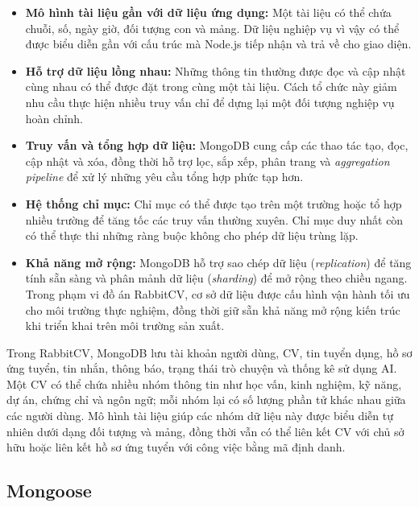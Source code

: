 \begin{itemize}
    \item \textbf{Mô hình tài liệu gần với dữ liệu ứng dụng:} Một tài liệu có thể chứa chuỗi, số, ngày giờ, đối tượng con và mảng. Dữ liệu nghiệp vụ vì vậy có thể được biểu diễn gần với cấu trúc mà Node.js tiếp nhận và trả về cho giao diện.

    \item \textbf{Hỗ trợ dữ liệu lồng nhau:} Những thông tin thường được đọc và cập nhật cùng nhau có thể được đặt trong cùng một tài liệu. Cách tổ chức này giảm nhu cầu thực hiện nhiều truy vấn chỉ để dựng lại một đối tượng nghiệp vụ hoàn chỉnh.

    \item \textbf{Truy vấn và tổng hợp dữ liệu:} MongoDB cung cấp các thao tác tạo, đọc, cập nhật và xóa, đồng thời hỗ trợ lọc, sắp xếp, phân trang và \textit{aggregation pipeline} để xử lý những yêu cầu tổng hợp phức tạp hơn.

    \item \textbf{Hệ thống chỉ mục:} Chỉ mục có thể được tạo trên một trường hoặc tổ hợp nhiều trường để tăng tốc các truy vấn thường xuyên. Chỉ mục duy nhất còn có thể thực thi những ràng buộc không cho phép dữ liệu trùng lặp.

    \item \textbf{Khả năng mở rộng:} MongoDB hỗ trợ sao chép dữ liệu (\textit{replication}) để tăng tính sẵn sàng và phân mảnh dữ liệu (\textit{sharding}) để mở rộng theo chiều ngang. Trong phạm vi đồ án RabbitCV, cơ sở dữ liệu được cấu hình vận hành tối ưu cho môi trường thực nghiệm, đồng thời giữ sẵn khả năng mở rộng kiến trúc khi triển khai trên môi trường sản xuất.
\end{itemize}

Trong RabbitCV, MongoDB lưu tài khoản người dùng, CV, tin tuyển dụng, hồ sơ ứng tuyển, tin nhắn, thông báo, trạng thái trò chuyện và thống kê sử dụng AI. Một CV có thể chứa nhiều nhóm thông tin như học vấn, kinh nghiệm, kỹ năng, dự án, chứng chỉ và ngôn ngữ; mỗi nhóm lại có số lượng phần tử khác nhau giữa các người dùng. Mô hình tài liệu giúp các nhóm dữ liệu này được biểu diễn tự nhiên dưới dạng đối tượng và mảng, đồng thời vẫn có thể liên kết CV với chủ sở hữu hoặc liên kết hồ sơ ứng tuyển với công việc bằng mã định danh.

\subsection{Mongoose}

